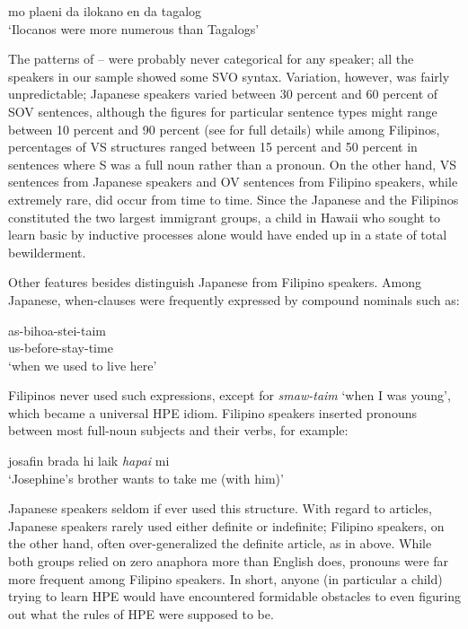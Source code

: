 \ea\label{ex:9}
mo plaeni da ilokano en da tagalog\\
\glt  `Ilocanos were more numerous than Tagalogs'
\z

The patterns of -- were probably never categorical for any speaker; all the speakers in our sample showed some SVO syntax. Variation, however, was fairly unpredictable; Japanese speakers varied between 30 percent and 60 percent of SOV sentences, although the figures for particular sentence types might range between 10 percent and 90 percent (see \citealt{BickertonEtAl1976b} for full details) while among Filipinos, percentages of VS structures ranged between 15 percent and 50 percent in sentences where S was a full noun rather than a pronoun. On the other hand, VS sentences from Japanese speakers and OV sentences from Filipino speakers, while extremely rare, did
occur from time to time. Since the Japanese and the Filipinos constituted the two largest immigrant groups, a child in Hawaii who sought to learn basic  by inductive processes alone would have ended up in a state of total bewilderment.

Other features besides  distinguish Japanese from Filipino speakers. Among Japanese, when-clauses were frequently expressed by compound nominals such as:

\ea\label{ex:10}
\gll  as-bihoa-stei-taim\\
 us-before-stay-time \\
\glt  `when we used to live here'
\z

\noindent Filipinos never used such expressions, except for \textit{smaw-taim} `when I was young', which became a universal HPE idiom. Filipino speakers inserted pronouns between most full-noun subjects and their verbs, for example:

\ea\label{ex:11}
josafin brada hi laik \textit{hapai} mi\\
\glt   `Josephine's brother wants to take me (with him)' 
\z

\noindent Japanese speakers seldom if ever used this structure. With regard to articles, Japanese speakers  rarely used either definite or indefinite; Filipino speakers, on the other hand, often over-generalized the definite article, as in  above. While both groups relied on zero anaphora more than English does, pronouns were far more frequent among Filipino speakers. In short, anyone (in particular a child) trying to learn HPE would have encountered formidable obstacles to even figuring out what the rules of HPE were supposed to be.

